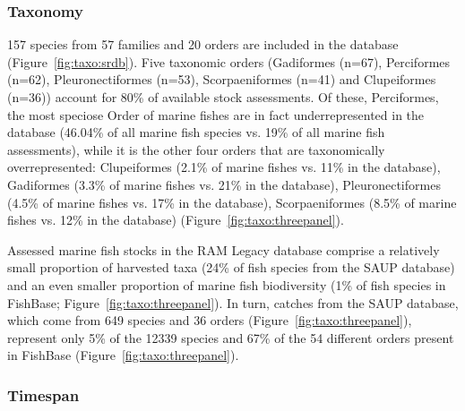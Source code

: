 
\subsubsection*{Taxonomy}

157 species from
57 families and 20
orders are included in the database (Figure~\ref{fig:taxo:srdb}). Five
taxonomic orders (Gadiformes (n=67),
Perciformes (n=62), Pleuronectiformes (n=53),
Scorpaeniformes (n=41) and Clupeiformes (n=36)) account for
80\% of available stock assessments.  Of these, Perciformes, the
most speciose Order of marine fishes are in fact underrepresented in
the database (46.04\% of all marine fish species vs.  19\%
of all marine fish assessments), while it is the other four orders
that are taxonomically overrepresented: Clupeiformes (2.1\% of marine
fishes vs.  11\% in the database), Gadiformes (3.3\% of marine fishes
vs.  21\% in the database), Pleuronectiformes (4.5\% of marine fishes
vs.  17\% in the database), Scorpaeniformes (8.5\% of marine fishes
vs. 12\% in the database) (Figure~\ref{fig:taxo:threepanel}).

Assessed marine fish stocks in the RAM Legacy database comprise a
relatively small proportion of harvested taxa (24\% of fish species
from the SAUP database) and an even smaller proportion of marine fish
biodiversity (1\% of fish species in FishBase;
Figure~\ref{fig:taxo:threepanel}). In turn, catches from the SAUP
database, which come from 649 species and
36 orders (Figure~\ref{fig:taxo:threepanel}),
represent only 5\% of the 12339 species and 67\% of
the 54 different orders present in FishBase
(Figure~\ref{fig:taxo:threepanel}).




\subsubsection*{Timespan }

